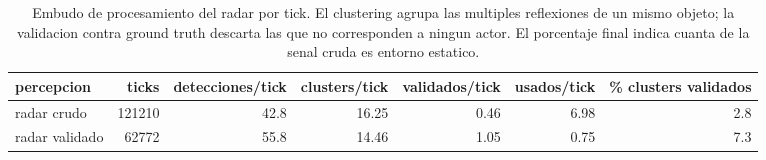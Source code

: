 \begin{table}[htbp]
  \centering
  \begin{tabular}{lrrrrrr}
    \toprule
    percepcion & ticks & detecciones/tick & clusters/tick & validados/tick & usados/tick & \% clusters validados \\
    \midrule
    radar crudo & 121210 & 42.8 & 16.25 & 0.46 & 6.98 & 2.8 \\
    radar validado & 62772 & 55.8 & 14.46 & 1.05 & 0.75 & 7.3 \\
    \bottomrule
  \end{tabular}
  \caption{Embudo de procesamiento del radar por tick. El clustering agrupa las multiples reflexiones de un mismo objeto; la validacion contra ground truth descarta las que no corresponden a ningun actor. El porcentaje final indica cuanta de la senal cruda es entorno estatico.}
  \label{tab:embudo_radar}
\end{table}
